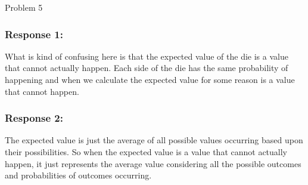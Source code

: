 \begin{problem}{Problem 5}
\begin{Highlight}[Solution]
        \subsubsection*{Response 1:}

        What is kind of confusing here is that the expected value of the die is a value that cannot actually happen. Each side of the die has the same probability of happening and when we calculate the
        expected value for some reason is a value that cannot happen. \vspace*{1em}

        \subsubsection*{Response 2:}

        The expected value is just the average of all possible values occurring based upon their possibilities. So when the expected value is a value that cannot actually happen, it just represents 
        the average value considering all the possible outcomes and probabilities of outcomes occurring.
    \end{Highlight}
\end{problem}

